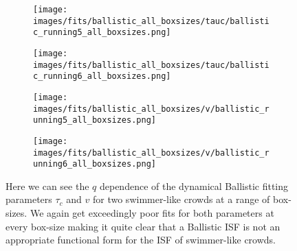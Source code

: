 \documentclass[10pt]{article}
\begin{document}
\begin{figure}[H]
\begin{subfigure}[t]{.5\textwidth}
  \centering
 \texttt{[image: images/fits/ballistic\_all\_boxsizes/tauc/ballistic\_running5\_all\_boxsizes.png]}
  \caption{}
\end{subfigure}%
\hfill
\begin{subfigure}[t]{.5\textwidth}
  \centering
  \texttt{[image: images/fits/ballistic\_all\_boxsizes/tauc/ballistic\_running6\_all\_boxsizes.png]}
  \caption{}
\end{subfigure}
\label{fig:running_ballistic_fits_tauc_all_boxsizes}
\par\bigskip
\begin{subfigure}[t]{.5\textwidth}
  \centering
 \texttt{[image: images/fits/ballistic\_all\_boxsizes/v/ballistic\_running5\_all\_boxsizes.png]}
  \caption{}
\end{subfigure}%
\hfill
\begin{subfigure}[t]{.5\textwidth}
  \centering
  \texttt{[image: images/fits/ballistic\_all\_boxsizes/v/ballistic\_running6\_all\_boxsizes.png]}
  \caption{}
\end{subfigure}
\caption{Here we can see the $q$ dependence of the dynamical Ballistic fitting parameters $\tau_c$ and $v$ for two swimmer-like crowds at a range of box-sizes. We again get exceedingly poor fits for both parameters at every box-size making it quite clear that a Ballistic ISF is not an appropriate functional form for the ISF of swimmer-like crowds.}
\label{fig:running_ballistic_fits_v_all_boxsizes}
\end{figure}
\end{document}
